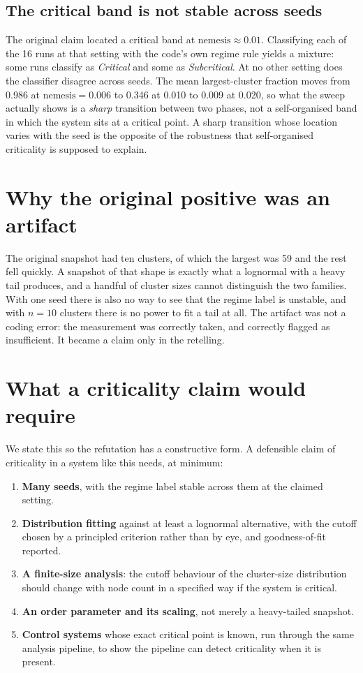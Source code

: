 \documentclass[11pt]{article}
\begin{document}
\subsection{The critical band is not stable across seeds}

The original claim located a critical band at $\text{nemesis} \approx 0.01$.
Classifying each of the 16 runs at that setting with the code's own regime
rule yields a mixture: some runs classify as \emph{Critical} and some as
\emph{Subcritical}. At no other setting does the classifier disagree across
seeds. The mean largest-cluster fraction moves from 0.986 at
$\text{nemesis} = 0.006$ to 0.346 at 0.010 to 0.009 at 0.020, so what the
sweep actually shows is a \emph{sharp} transition between two phases, not a
self-organised band in which the system sits at a critical point. A sharp
transition whose location varies with the seed is the opposite of the
robustness that self-organised criticality is supposed to explain.

\section{Why the original positive was an artifact}

The original snapshot had ten clusters, of which the largest was 59 and the
rest fell quickly. A snapshot of that shape is exactly what a lognormal
with a heavy tail produces, and a handful of cluster sizes cannot
distinguish the two families. With one seed there is also no way to see
that the regime label is unstable, and with $n = 10$ clusters there is no
power to fit a tail at all. The artifact was not a coding error: the
measurement was correctly taken, and correctly flagged as insufficient.
It became a claim only in the retelling.

\section{What a criticality claim would require}
\label{sec:controls}

We state this so the refutation has a constructive form. A defensible claim
of criticality in a system like this needs, at minimum:

\begin{enumerate}
\item \textbf{Many seeds}, with the regime label stable across them at the
  claimed setting.
\item \textbf{Distribution fitting} against at least a lognormal
  alternative, with the cutoff chosen by a principled criterion rather than
  by eye, and goodness-of-fit reported.
\item \textbf{A finite-size analysis}: the cutoff behaviour of the
  cluster-size distribution should change with node count in a specified
  way if the system is critical.
\item \textbf{An order parameter and its scaling}, not merely a
  heavy-tailed snapshot.
\item \textbf{Control systems} whose exact critical point is known, run
  through the same analysis pipeline, to show the pipeline can detect
  criticality when it is present.
\end{enumerate}
\end{document}

